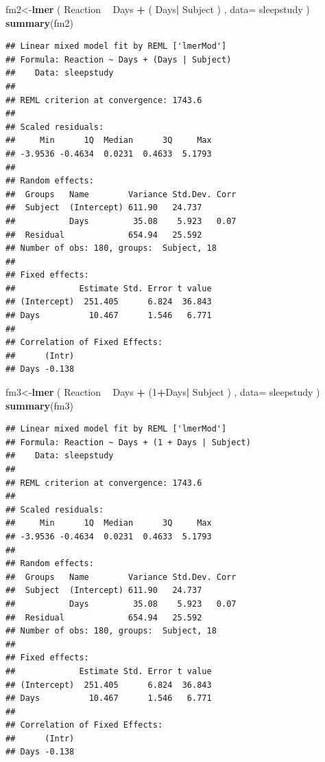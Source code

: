 \documentclass[]{book}
\newenvironment{Shaded}{\begin{snugshade}}{\end{snugshade}}
\newcommand{\DataTypeTok}[1]{\textcolor[rgb]{0.13,0.29,0.53}{#1}}
\newcommand{\DecValTok}[1]{\textcolor[rgb]{0.00,0.00,0.81}{#1}}
\newcommand{\KeywordTok}[1]{\textcolor[rgb]{0.13,0.29,0.53}{\textbf{#1}}}
\newcommand{\NormalTok}[1]{#1}
\newcommand{\OperatorTok}[1]{\textcolor[rgb]{0.81,0.36,0.00}{\textbf{#1}}}
\newcommand{\StringTok}[1]{\textcolor[rgb]{0.31,0.60,0.02}{#1}}
\begin{document}
\begin{Shaded}
\begin{Highlighting}[]
\NormalTok{fm2<-}\KeywordTok{lmer}\NormalTok{ ( Reaction }\OperatorTok{~}\StringTok{ }\NormalTok{Days }\OperatorTok{+}\StringTok{ }\NormalTok{( Days}\OperatorTok{|}\StringTok{ }\NormalTok{Subject ) , }\DataTypeTok{data=}\NormalTok{ sleepstudy )}
\KeywordTok{summary}\NormalTok{(fm2)}
\end{Highlighting}
\end{Shaded}

\begin{verbatim}
## Linear mixed model fit by REML ['lmerMod']
## Formula: Reaction ~ Days + (Days | Subject)
##    Data: sleepstudy
## 
## REML criterion at convergence: 1743.6
## 
## Scaled residuals: 
##     Min      1Q  Median      3Q     Max 
## -3.9536 -0.4634  0.0231  0.4633  5.1793 
## 
## Random effects:
##  Groups   Name        Variance Std.Dev. Corr
##  Subject  (Intercept) 611.90   24.737       
##           Days         35.08    5.923   0.07
##  Residual             654.94   25.592       
## Number of obs: 180, groups:  Subject, 18
## 
## Fixed effects:
##             Estimate Std. Error t value
## (Intercept)  251.405      6.824  36.843
## Days          10.467      1.546   6.771
## 
## Correlation of Fixed Effects:
##      (Intr)
## Days -0.138
\end{verbatim}

\begin{Shaded}
\begin{Highlighting}[]
\NormalTok{fm3<-}\KeywordTok{lmer}\NormalTok{ ( Reaction }\OperatorTok{~}\StringTok{ }\NormalTok{Days }\OperatorTok{+}\StringTok{ }\NormalTok{(}\DecValTok{1}\OperatorTok{+}\NormalTok{Days}\OperatorTok{|}\StringTok{ }\NormalTok{Subject ) , }\DataTypeTok{data=}\NormalTok{ sleepstudy )}
\KeywordTok{summary}\NormalTok{(fm3)}
\end{Highlighting}
\end{Shaded}

\begin{verbatim}
## Linear mixed model fit by REML ['lmerMod']
## Formula: Reaction ~ Days + (1 + Days | Subject)
##    Data: sleepstudy
## 
## REML criterion at convergence: 1743.6
## 
## Scaled residuals: 
##     Min      1Q  Median      3Q     Max 
## -3.9536 -0.4634  0.0231  0.4633  5.1793 
## 
## Random effects:
##  Groups   Name        Variance Std.Dev. Corr
##  Subject  (Intercept) 611.90   24.737       
##           Days         35.08    5.923   0.07
##  Residual             654.94   25.592       
## Number of obs: 180, groups:  Subject, 18
## 
## Fixed effects:
##             Estimate Std. Error t value
## (Intercept)  251.405      6.824  36.843
## Days          10.467      1.546   6.771
## 
## Correlation of Fixed Effects:
##      (Intr)
## Days -0.138
\end{verbatim}
\end{document}

